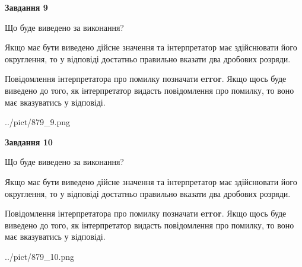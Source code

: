 \documentclass[12pt, ukrainian]{article}
\begin{document}
{\begin {Large}
{\begin {center}\textbf{Завдання 9}\end {center}}\par
Що буде виведено за виконання? \par

Якщо має бути виведено дійсне значення та інтерпретатор має здійснювати його округлення, 
то у відповіді достатньо правильно вказати два дробових розряди.

Повідомлення інтерпретатора про помилку позначати \textbf{error}.
Якщо щось буде виведено до того, як інтерпретатор видасть повідомлення про помилку, 
то воно має вказуватись у відповіді. \par

\begin{center}
	{../pict/879_9.png}
\end{center}
\newpage

{\begin {center}\textbf{Завдання 10}\end {center}}\par
Що буде виведено за виконання? \par

Якщо має бути виведено дійсне значення та інтерпретатор має здійснювати його округлення, 
то у відповіді достатньо правильно вказати два дробових розряди.

Повідомлення інтерпретатора про помилку позначати \textbf{error}.
Якщо щось буде виведено до того, як інтерпретатор видасть повідомлення про помилку, 
то воно має вказуватись у відповіді. \par

\begin{center}
	{../pict/879_10.png}
\end{center}
\newpage

\end {Large}}
\end{document}
